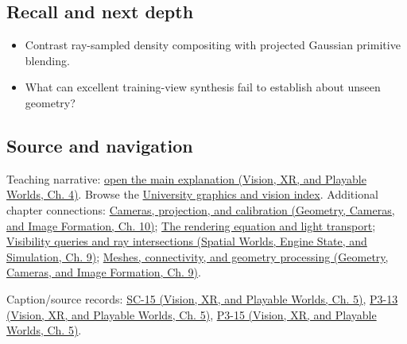 \subsection{Recall and next depth}\label{appendix-c5b332e400e7-recall-and-next-depth}

\hypertarget{appendix-c5b332e400e7-recall-and-next-depth}{}

\begin{itemize}
\tightlist
\item
  Contrast ray-sampled density compositing with projected Gaussian primitive blending.
\item
  What can excellent training-view synthesis fail to establish about unseen geometry?
\end{itemize}

\subsection{Source and navigation}\label{appendix-c5b332e400e7-source-and-navigation}

\hypertarget{appendix-c5b332e400e7-source-and-navigation}{}

Teaching narrative: \href{../07-Vision-XR-and-Playable-Worlds/main.pdf\#nameddest=04-visual-computing-ii-ch034-learned-representations-of-3d-shape-and-scenes}{open the main explanation (Vision, XR, and Playable Worlds, Ch. 4)}. Browse the \hyperref[appendix-a6d556a4ef50-university-graphics-vision-and-photography---independent-series]{University graphics and vision index}. Additional chapter connections: \href{../03-Geometry-Cameras-and-Image-Formation/main.pdf\#nameddest=03-visual-computing-i-ch003-cameras-projection-and-calibration}{Cameras, projection, and calibration (Geometry, Cameras, and Image Formation, Ch. 10)}; \hyperref[03-visual-computing-i-ch007-the-rendering-equation-and-light-transport]{The rendering equation and light transport}; \href{../05-Spatial-Worlds-Engine-State-and-Simulation/main.pdf\#nameddest=04-visual-computing-ii-ch028-visibility-queries-and-ray-intersections-1}{Visibility queries and ray intersections (Spatial Worlds, Engine State, and Simulation, Ch. 9)}; \href{../03-Geometry-Cameras-and-Image-Formation/main.pdf\#nameddest=03-visual-computing-i-ch002-meshes-connectivity-and-geometry-processing}{Meshes, connectivity, and geometry processing (Geometry, Cameras, and Image Formation, Ch. 9)}.

Caption/source records: \href{../07-Vision-XR-and-Playable-Worlds/main.pdf\#nameddest=04-visual-computing-ii-ch036-sc-15---stanford-cs231n-deep-learning-for-computer-vision-spring-2025-lecture-15-3d-vision}{SC-15 (Vision, XR, and Playable Worlds, Ch. 5)}, \href{../07-Vision-XR-and-Playable-Worlds/main.pdf\#nameddest=04-visual-computing-ii-ch036-p3-13---curves-and-surfaces}{P3-13 (Vision, XR, and Playable Worlds, Ch. 5)}, \href{../07-Vision-XR-and-Playable-Worlds/main.pdf\#nameddest=04-visual-computing-ii-ch036-p3-15---ray-tracing}{P3-15 (Vision, XR, and Playable Worlds, Ch. 5)}.
